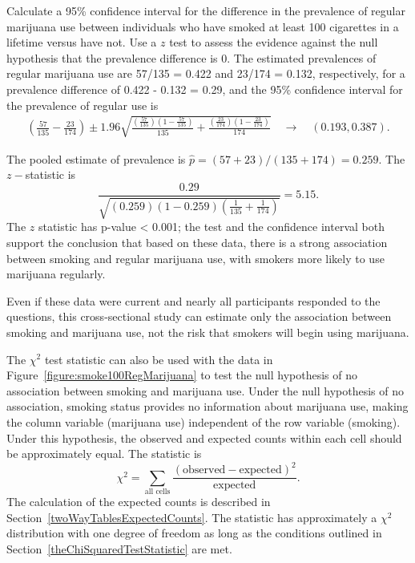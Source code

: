 \begin{examplewrap}
\begin{nexample}{Calculate a 95\% confidence interval for the difference in the prevalence of regular marijuana use between individuals who have smoked at least 100 cigarettes in a lifetime versus have not. Use a $z$ test to assess the evidence against the null hypothesis that the prevalence difference is 0.}
The estimated prevalences of regular marijuana use are 57/135 = 0.422 and 23/174 = 0.132, respectively, for a prevalence difference of 0.422 - 0.132 = 0.29, and the 95\% confidence interval for the prevalence of regular use is
\begin{align*}
   \left( \frac{57}{135} - \frac{23}{174} \right) \pm 1.96  \sqrt{\frac{(\frac{57}{135} )
   (1 - \frac{57}{135} )}{135}
   + \frac{(\frac{23}{174})(1 - \frac{23}{174})}{174}} \quad \to \quad (0.193, 0.387).
\end{align*}

The pooled estimate of prevalence is  $\hat{p} = (57 + 23)/(135 + 174) = 0.259$.  The $z-$statistic is
\[
   \frac{0.29}{\sqrt{(0.259)(1 - 0.259)\left(\frac{1}{135} + \frac{1}{174} \right)}} = 5.15.
\]
The $z$ statistic has p-value < 0.001; the test and the confidence interval both support the conclusion that based on these data, there is a strong association between smoking and regular marijuana use, with smokers more likely to use marijuana regularly.
\end{nexample}
\end{examplewrap}

Even if these data were current and nearly all participants responded to the questions, this cross-sectional study can estimate only the association between smoking and marijuana use, not the risk that smokers will begin using marijuana.

The $\chi^2$ test statistic can also be used with the data in Figure~\ref{figure:smoke100RegMarijuana} to test the null hypothesis of no association between smoking and marijuana use. Under the null hypothesis of no association, smoking status provides no information about marijuana use, making the column variable (marijuana use) independent of the row variable (smoking). Under this hypothesis, the observed and expected counts within each cell should be approximately equal.  The statistic is
\[
\chi^2 = \sum_{\text{all cells}} \frac{(\text{observed} - \text{expected})^2}{\text{expected}}.
\]
The calculation of the expected counts is described in Section~\ref{twoWayTablesExpectedCounts}.
The statistic has approximately a $\chi^2$ distribution with one degree of freedom as long as the conditions outlined in Section~\ref{theChiSquaredTestStatistic} are met.

